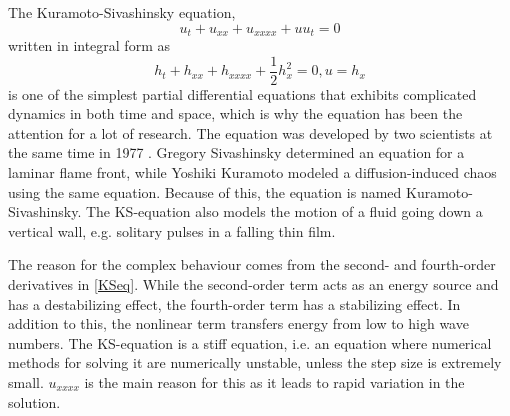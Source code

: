The Kuramoto-Sivashinsky equation,
\begin{equation}
\label{KSeq}
u_t + u_{xx} + u_{xxxx} + uu_{t} = 0 
\end{equation}
written in integral form as
\begin{equation*}
h_t + h_{xx} + h_{xxxx} + \frac{1}{2}h^2_x = 0, u = h_x 
\end{equation*}
is one of the simplest partial differential equations that exhibits complicated dynamics in both time and space, which is why the equation has been the attention for a lot of research. The equation was developed by two scientists at the same time in 1977 \cite{development}. Gregory Sivashinsky determined an equation for a laminar flame front, while Yoshiki Kuramoto modeled a diffusion-induced chaos using the same equation. Because of this, the equation is named Kuramoto-Sivashinsky. The KS-equation also models the motion of a fluid going down a vertical wall, e.g. solitary pulses in a falling thin film. \cite{trivia}

The reason for the complex behaviour comes from the second- and fourth-order derivatives in \eqref{KSeq}. While the second-order term acts as an energy source and has a destabilizing effect, the fourth-order term has a stabilizing effect. In addition to this, the nonlinear term transfers energy from low to high wave numbers. \cite{stabil} The KS-equation is a stiff equation, i.e. an equation where numerical methods for solving it are numerically unstable, unless the step size is extremely small. $u_{xxxx}$ is the main reason for this as it leads to rapid variation in the solution.








